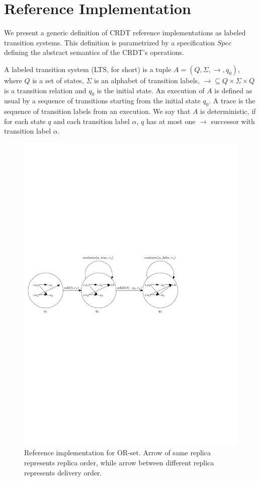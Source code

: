 
\section{Reference Implementation}
\label{sec:reference implementation}


We present a generic definition of CRDT reference implementations as labeled transition systems. This definition is parametrized by a specification $Spec$ defining the abstract semantics of the CRDT's operations.

A labeled transition system (LTS, for short) is a tuple $A = (Q,\Sigma,\rightarrow,q_0)$, where $Q$ is a set of states, $\Sigma$ is an alphabet of transition labels, $\rightarrow \subseteq Q \times \Sigma \times Q$ is a transition relation and $q_0$ is the initial state. An execution of $A$ is defined as usual by a sequence of transitions starting from the initial state $q_0$. A trace is the sequence of transition labels from an execution. We say that $A$ is deterministic, if for each state $q$ and each transition label $\alpha$, $q$ has at most one $\rightarrow$ successor with transition label $\alpha$.


\begin{figure}[t]
  \centering
  \includegraphics[width=0.7 \textwidth]{figures/PIC-RImp.pdf}
  \caption{Reference implementation for OR-set. Arrow of same replica represents replica order, while arrow between different replica represents delivery order.}
  \label{fig:reference implementation for OR-set}
\end{figure}

